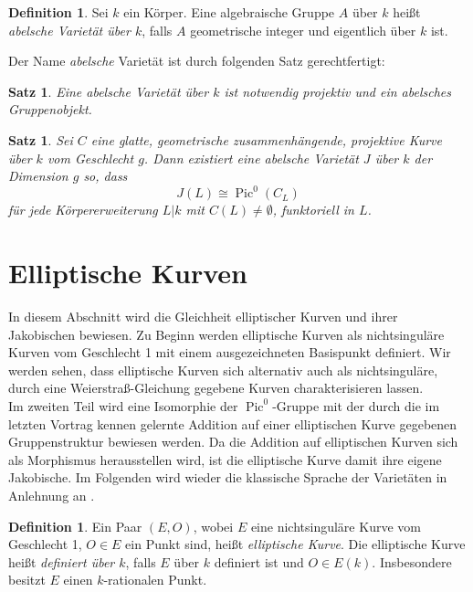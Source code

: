 \documentclass{amsart}
\theoremstyle{plain}
\newtheorem{proposition}[subsection]{Satz}
\theoremstyle{definition}
\newtheorem{definition}[subsection]{Definition}
\newcommand{\pic}{\operatorname{Pic}}
\begin{document}
\begin{definition}
	Sei $k$ ein Körper. Eine algebraische Gruppe $A$ über $k$ heißt {\it abelsche Varietät über $k$}, falls $A$ geometrische integer und eigentlich über $k$ ist.
\end{definition}

\noindent Der Name {\it abelsche} Varietät ist durch folgenden Satz gerechtfertigt:
\begin{proposition}
	Eine abelsche Varietät über $k$ ist notwendig projektiv und ein abelsches Gruppenobjekt.
\end{proposition}

\begin{proposition}
	Sei $C$ eine glatte, geometrische zusammenhängende, projektive Kurve über $k$ vom Geschlecht $g$. Dann existiert eine abelsche Varietät $J$ über $k$ der Dimension $g$ so, dass 
	\begin{equation*}
		J(L) \cong \pic^0(C_L)
	\end{equation*}
	für jede Körpererweiterung $L|k$ mit $C(L) \neq \emptyset$, funktoriell in $L$.
\end{proposition}




\section{Elliptische Kurven}
\label{section-elliptische-kurven}

In diesem Abschnitt wird die Gleichheit elliptischer Kurven und ihrer Jakobischen bewiesen.
Zu Beginn werden elliptische Kurven als nichtsinguläre Kurven vom Geschlecht 1 mit einem ausgezeichneten Basispunkt definiert.
Wir werden sehen, dass elliptische Kurven sich alternativ auch als nichtsinguläre, durch eine Weierstraß-Gleichung gegebene Kurven charakterisieren lassen. \\
Im zweiten Teil wird eine Isomorphie der $\pic^0$-Gruppe mit der durch die im letzten Vortrag kennen gelernte Addition auf einer elliptischen Kurve gegebenen Gruppenstruktur bewiesen werden.
Da die Addition auf elliptischen Kurven sich als Morphismus herausstellen wird, ist die elliptische Kurve damit ihre eigene Jakobische.
Im Folgenden wird wieder die klassische Sprache der Varietäten in Anlehnung an \cite{silverman}.

\begin{definition}
	Ein Paar $(E, O)$, wobei $E$ eine nichtsinguläre Kurve vom Geschlecht 1, $O \in E$ ein Punkt sind, heißt {\it elliptische Kurve}.
	Die elliptische Kurve heißt {\it definiert über $k$}, falls $E$ über $k$ definiert ist und $O \in E(k)$. Insbesondere besitzt $E$ einen $k$-rationalen Punkt.
\end{definition}
\end{document}
